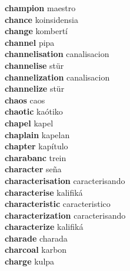 \textbf{champion } maestro \\
\textbf{chance } koinsidensia \\
\textbf{change } kombertí \\
\textbf{channel } pipa \\
\textbf{channelisation } canalisacion \\
\textbf{channelise } stür \\
\textbf{channelization } canalisacion \\
\textbf{channelize } stür \\
\textbf{chaos } caos \\
\textbf{chaotic } kaótiko \\
\textbf{chapel } kapel \\
\textbf{chaplain } kapelan \\
\textbf{chapter } kapítulo \\
\textbf{charabanc } trein \\
\textbf{character } seña \\
\textbf{characterisation } caracterisando \\
\textbf{characterise } kalifiká \\
\textbf{characteristic } caracteristico \\
\textbf{characterization } caracterisando \\
\textbf{characterize } kalifiká \\
\textbf{charade } charada \\
\textbf{charcoal } karbon \\
\textbf{charge } kulpa \\
